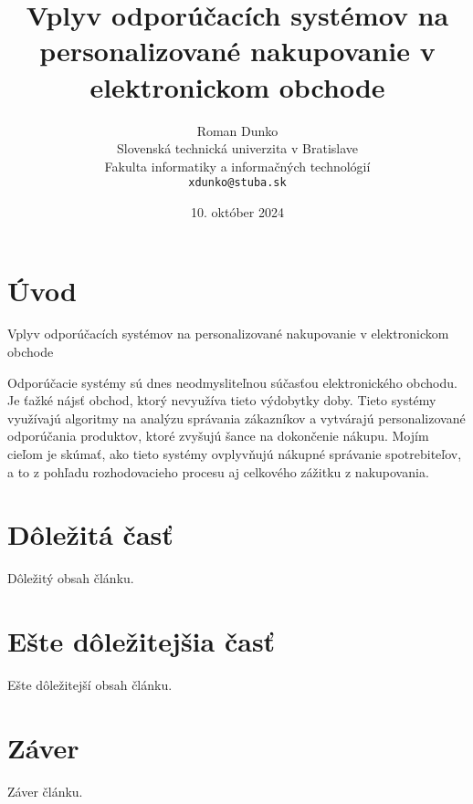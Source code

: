 \documentclass[10pt,slovak,a4paper]{article}
\title{Vplyv odporúčacích systémov na personalizované nakupovanie v elektronickom
obchode}
\author{
\begin{minipage}[t]{0.85\textwidth}
    \vspace{-2ex}
    Roman Dunko\\[2pt]
	{\small Slovenská technická univerzita v Bratislave}\\
	{\small Fakulta informatiky a informačných technológií}\\
	{\small \texttt{xdunko@stuba.sk}}
\end{minipage}
}
\date{\small 10. október 2024}
\begin{document}
\maketitle

\begin{abstract}
\end{abstract}

\section{Úvod}
Vplyv odporúčacích systémov na personalizované nakupovanie v elektronickom obchode \cite{PLP-Framework}

Odporúčacie systémy sú dnes neodmysliteľnou súčasťou elektronického obchodu. Je ťažké nájsť obchod, ktorý nevyužíva tieto výdobytky doby. Tieto systémy využívajú algoritmy na analýzu správania zákazníkov a vytvárajú personalizované odporúčania produktov, ktoré zvyšujú šance na dokončenie nákupu. Mojím cieľom je skúmať, ako tieto systémy ovplyvňujú nákupné správanie spotrebiteľov, a to z pohľadu rozhodovacieho procesu aj celkového zážitku z nakupovania.



\section{Dôležitá časť} \label{dolezita}
Dôležitý obsah článku.

\section{Ešte dôležitejšia časť} \label{dolezitejsia}
Ešte dôležitejší obsah článku.

\section{Záver} \label{zaver}
Záver článku.

\end{document}
